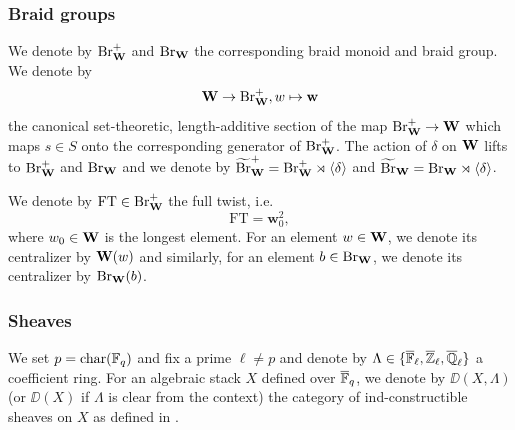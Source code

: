 \documentclass[article, 10pt, oneside, reqno]{amsart}
\theoremstyle{plain}
\theoremstyle{definition}
\theoremstyle{remark}
\newcommand{\FT}{\mathrm{FT}}
\newcommand{\wbf}{\mathbf{w}}
\begin{document}
\subsubsection{Braid groups}

We denote by $\mathrm{Br}_{\mathbf{W}}^+$ and $\mathrm{Br}_{\mathbf{W}}$ the corresponding braid monoid and braid group. We denote by 
$$\Wbf \to \Br_{\Wbf}^+, w \mapsto \wbf$$
the canonical set-theoretic, length-additive section of the map $\mathrm{Br}^+_{\mathbf{W}} \to \mathbf{W}$ which maps $s \in S$ onto the corresponding generator of $\mathrm{Br}_{\mathbf{W}}^+$. The action of $\delta$ on $\mathbf{W}$ lifts to $\mathrm{Br}_{\mathbf{W}}^+$ and $\mathrm{Br}_{\mathbf{W}}$ and we denote by $\widetilde{\mathrm{Br}}^+_{\mathbf{W}} = \mathrm{Br}_{\mathbf{W}}^+ \rtimes \langle \delta \rangle$ and $\widetilde{\mathrm{Br}}_{\mathbf{W}} = \mathrm{Br}_{\mathbf{W}} \rtimes \langle \delta \rangle$. 

We denote by $\FT \in \Br_{\Wbf}^+$ the full twist, i.e. 
$$\FT = \wbf_0^2,$$
where $w_0 \in \mathbf{W}$ is the longest element. For an element $w \in \mathbf{W}$, we denote its centralizer by $\mathbf{W}(w)$ and similarly, for an element $b \in \mathrm{Br}_{\mathbf{W}}$, we denote its centralizer by $\mathrm{Br}_{\mathbf{W}}(b)$.


\subsubsection{Sheaves} We set $p = \operatorname{char}(\mathbb{F}_q)$ and fix a prime $\ell \neq p$ and denote by $\Lambda \in \{\overline{\mathbb{F}}_{\ell},\overline{\mathbb{Z}}_{\ell}, \overline{\mathbb{Q}}_{\ell}\}$ a coefficient ring. For an algebraic stack $X$ defined over $\overline{\mathbb{F}}_q$, we denote by $\DD(X, \Lambda)$ (or $\DD(X)$ if $\Lambda$ is clear from the context) the category of ind-constructible sheaves on $X$ as defined in \cite{GaitsgoryLurie}.
\end{document}
